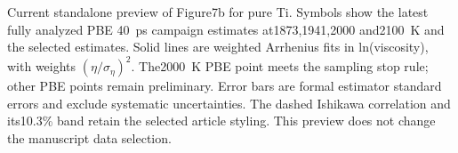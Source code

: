 \caption{Current standalone preview of Figure7b for pure Ti. Symbols show the latest fully analyzed PBE 40~ps campaign estimates at1873,1941,2000 and2100~K and the selected \rscan{} estimates. Solid lines are weighted Arrhenius fits in ln(viscosity), with weights $(\eta/\sigma_\eta)^2$. The2000~K PBE point meets the sampling stop rule; other PBE points remain preliminary. Error bars are formal estimator standard errors and exclude systematic uncertainties. The dashed Ishikawa correlation and its10.3\% band retain the selected article styling. This preview does not change the manuscript data selection.}
